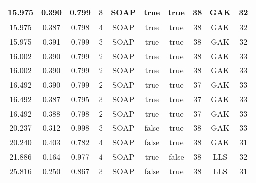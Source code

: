 \documentclass[12pt]{article}
\begin{document}
\begin{table}[H]
\begin{tabular}{|c|c|c|c|c|c|c|c|c|c|}
		15.975	& 0.390	& 0.799	& 3	& SOAP	& true	& true	& 38	& GAK	& 32	\\ \hline
		15.975	& 0.387	& 0.798	& 4	& SOAP	& true	& true	& 38	& GAK	& 32	\\ \hline
		15.975	& 0.391	& 0.799	& 3	& SOAP	& true	& true	& 38	& GAK	& 32	\\ \hline
		16.002	& 0.390	& 0.799	& 2	& SOAP	& true	& true	& 38	& GAK	& 33	\\ \hline
		16.002	& 0.390	& 0.799	& 2	& SOAP	& true	& true	& 38	& GAK	& 33	\\ \hline
		16.492	& 0.390	& 0.799	& 2	& SOAP	& true	& true	& 37	& GAK	& 33	\\ \hline
		16.492	& 0.387	& 0.795	& 3	& SOAP	& true	& true	& 37	& GAK	& 33	\\ \hline
		16.492	& 0.388	& 0.798	& 2	& SOAP	& true	& true	& 37	& GAK	& 33	\\ \hline
		20.237	& 0.312	& 0.998	& 3	& SOAP	& false	& true	& 38	& GAK	& 33	\\ \hline
		20.240	& 0.403	& 0.782	& 4	& SOAP	& false	& true	& 38	& GAK	& 31	\\ \hline
		21.886	& 0.164	& 0.977	& 4	& SOAP	& true	& false	& 38	& LLS	& 32	\\ \hline
		25.816	& 0.250	& 0.867	& 3	& SOAP	& false	& true	& 38	& LLS	& 31	\\ \hline
	\end{tabular}
	\label{tab:hyperopt}
\end{table}
\end{document}
